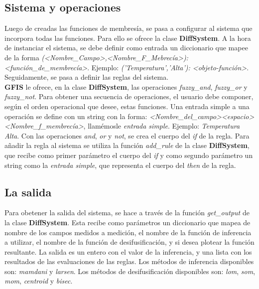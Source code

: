 \documentclass[11pt]{article}
\begin{document}
\subsection{Sistema y operaciones}
Luego de creadas las funciones de membres\'ia, se pasa a configurar al sistema que incorpora todas las funciones. Para ello se ofrece la clase \textbf{DiffSystem}. A la hora de instanciar el sistema, se debe definir como entrada un diccionario que mapee de la forma 
 \textit{(\textless Nombre\_Campo\textgreater,\textless Nombre\_F\_Mebrec\'ia\textgreater): \textless funci\'on\_de\_membrec\'ia\textgreater}. Ejemplo: \textit{('Temperatura','Alta'): \textless objeto-funci\'on\textgreater}. Seguidamente, se pasa a definir las reglas del sistema.\\
  \textbf{GFIS} le ofrece, en la clase \textbf{DiffSystem}, las operaciones \emph{fuzzy\_and}, \emph{fuzzy\_or} y \emph{fuzzy\_not}. Para obtener una secuencia de operaciones, el usuario debe componer, seg\'un el orden operacional que desee, estas funciones. Una entrada simple a una operaci\'on se define con un string con la forma: \emph{\textless Nombre\_del\_campo\textgreater \textless espacio\textgreater \textless Nombre\_f\_membrec\'ia\textgreater}, llam\'emosle \emph{entrada simple}. Ejemplo: \emph{Temperatura Alta}. Con las operaciones \emph{and}, \emph{or} y \emph{not}, se crea el cuerpo del \emph{if} de la regla. Para a\~nadir la regla al sistema se utiliza la funci\'on \emph{add\_rule} de la clase \textbf{DiffSystem}, que recibe como primer par\'ametro el cuerpo del \emph{if} y como segundo par\'ametro un string como la \emph{entrada simple}, que representa el cuerpo del \emph{then} de la regla.
 \subsection{La salida}
 Para obetener la salida del sistema, se hace a trav\'es de la funci\'on \emph{get\_output} de la clase \textbf{DiffSystem}. Esta recibe como par\'ametros un diccionario que mapea de nombre de los campos medidos a medici\'on, el nombre de la funci\'on de inferencia a utilizar, el nombre de la funci\'on de desifusificaci\'on, y si desea plotear la funci\'on resultante.
 La salida es un entero con el valor de la inferencia, y una lista con los resultados de las evaluaciones de las reglas.
 Los m\'etodos de inferencia disponibles son: \emph{mamdani} y \emph{larsen}.
 Los m\'etodos de desifusificaci\'on disponibles son: \emph{lom}, \emph{som}, \emph{mom}, \emph{centroid} y \emph{bisec}.
\end{document}
